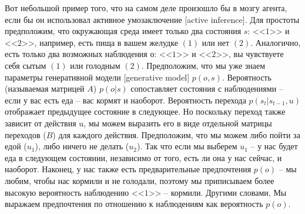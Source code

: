 \documentclass[twoside,leqno, 11pt]{article}
\begin{document}
	Вот небольшой пример того, что на самом деле произошло бы в мозгу агента, если бы он использовал активное умозаключение [active inference]. Для простоты предположим, что окружающая среда имеет только два состояния $s$: <<$1$>> и <<$2$>>, например, есть пища в вашем желудке $(1)$ или нет $(2)$. Аналогично, есть только два возможных наблюдения $о$: <<$1$>> и <<$2$>>, вы чувствуете себя сытым $(1)$ или голодным $(2)$. Предположим, что мы уже знаем параметры генеративной модели [generative model] $p(o,s)$. Вероятность (называемая матрицей $A$) $p(o|s)$ сопоставляет состояния с наблюдениями -- если у вас есть еда -- вас кормят и наоборот. Вероятность перехода $p(s_t|s_{t-1},u)$ отображает предыдущее состояние в следующее. Но поскольку переход также зависит от действия u, мы можем выразить его в виде отдельной матрицы переходов ($B$) для каждого действия. Предположим, что мы можем либо пойти за едой ($u_1$), либо ничего не делать ($u_2$). Так что если мы выберем $u_1$ -- у нас будет еда в следующем состоянии, независимо от того, есть ли она у нас сейчас, и наоборот. Наконец, у нас также есть предварительные предпочтения $p(o)$ -- мы любим, чтобы нас кормили и не голодали, поэтому мы приписываем более высокую вероятность наблюдению <<$1$>> -- кормили. Другими словами, Мы выражаем предпочтения по отношению к наблюдениям как вероятность $p(o)$.
	
	\begin{figure}[h]
	\end{figure}
	
	
\end{document}
